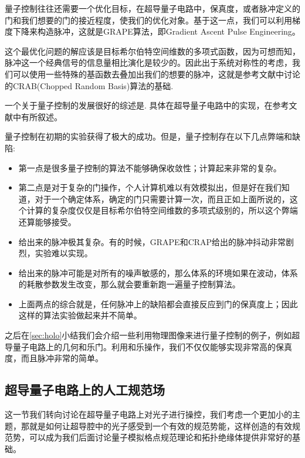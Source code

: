 \documentclass[supercite]{HustGraduPaper}
\begin{document}
量子控制往往还需要一个优化目标，在超导量子电路中，保真度，或者脉冲定义的门和我们想要的门的接近程度，使我们的优化对象。基于这一点，我们可以利用梯度下降\cite{khaneja2005optimal,floether2012robust}来构造脉冲，这就是GRAPE算法，即Gradient Ascent Pulse Engineering。

	这个最优化问题的解应该是目标希尔伯特空间维数的多项式函数，因为可想而知，脉冲这一个经典信号的信息量相比演化是较少的\cite{lloyd2014information}。因此出于系统对称性的考虑，我们可以使用一些特殊的基函数去叠加出我们的想要的脉冲，这就是参考文献\cite{doria2011optimal,caneva2011chopped}中讨论的CRAB(Chopped Random Basis)算法的基础.
	
	一个关于量子控制的发展很好的综述是\cite{glaser2015training}. 具体在超导量子电路中的实现，在参考文献\cite{egger2014adaptive,egger2013optimized}中有所叙述。
	
	
	量子控制在初期的实验获得了极大的成功。但是，量子控制存在以下几点弊端和缺陷:
	\begin{itemize}
		\item 第一点是很多量子控制的算法不能够确保收敛性；计算起来非常的复杂。
		\item 第二点是对于复杂的门操作，个人计算机难以有效模拟出，但是好在我们知道，对于一个确定体系，确定的门只需要计算一次，而且正如上面所说的，这个计算的复杂度仅仅是目标希尔伯特空间维数的多项式级别的，所以这个弊端还算能够接受。
		\item 给出来的脉冲极其复杂。有的时候，GRAPE和CRAP给出的脉冲抖动非常剧烈，实验难以实现。
		\item 给出来的脉冲可能是对所有的噪声敏感的，那么体系的环境如果在波动，体系的耗散参数发生改变，那么就会要重新跑一遍量子控制算法。
		\item 上面两点的综合就是，任何脉冲上的缺陷都会直接反应到门的保真度上；因此这样的算法实验做起来并不简单。
	\end{itemize}


之后在\ref{sec:holo}小结我们会介绍一些利用物理图像来进行量子控制的例子，例如超导量子电路上的几何和乐门\cite{hong2018implementing,egger2019entanglement}。利用和乐操作，我们不仅仅能够实现非常高的保真度，而且脉冲非常的简单。
   
   
   \subsection{超导量子电路上的人工规范场}
   这一节我们转向讨论在超导量子电路上对光子进行操控，我们考虑一个更加小的主题，那就是如何让超导腔中的光子感受到一个有效的规范势能，这样创造的有效规范势，可以成为我们后面讨论量子模拟格点规范理论和拓扑绝缘体提供非常好的基础。
   
\end{document}
